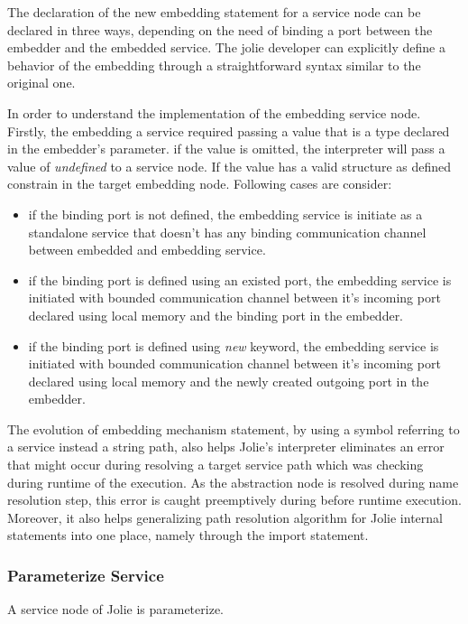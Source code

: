 The declaration of the new embedding statement for a service node can be declared in three ways, depending on the need of binding a port between the embedder and the embedded service. The jolie developer can explicitly define a behavior of the embedding through a straightforward syntax similar to the original one. 

In order to understand the implementation of the embedding service node. Firstly, the embedding a service required passing a value that is a type declared in the embedder's parameter. if the value is omitted, the interpreter will pass a value of \textit{undefined} to a service node. If the value has a valid structure as defined constrain in the target embedding node. Following cases are consider:

\begin{itemize}
    \item if the binding port is not defined, the embedding service is initiate as a standalone service that doesn't has any binding communication channel between embedded and embedding service.
    \item if the binding port is defined using an existed port, the embedding service is initiated with bounded communication channel between it's incoming port declared using local memory and the binding port in the embedder.
    \item if the binding port is defined using \textit{new} keyword, the embedding service is initiated with bounded communication channel between it's incoming port declared using local memory and the newly created outgoing port in the embedder.
\end{itemize}

The evolution of embedding mechanism statement, by using a symbol referring to a service instead a string path, also helps Jolie's interpreter eliminates an error that might occur during resolving a target service path which was checking during runtime of the execution. As the abstraction node is resolved during name resolution step, this error is caught preemptively during before runtime execution. Moreover, it also helps generalizing path resolution algorithm for Jolie internal statements into one place, namely through the import statement.

\subsubsection{Parameterize Service}

A service node of Jolie is parameterize. 

